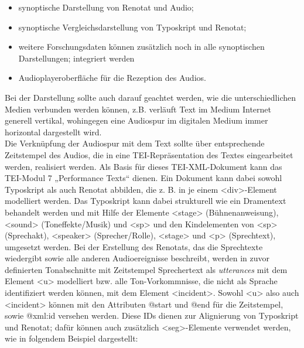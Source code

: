 \documentclass{article}
\begin{document}
        \begin{itemize}\item {synoptische Darstellung von Renotat und Audio;}\item {synoptische Vergleichsdarstellung von Typoskript und Renotat;}\item {weitere Forschungsdaten können zusätzlich noch in alle synoptischen
                     Darstellungen; integriert werden}\item {Audioplayeroberfläche für die Rezeption des Audios.}\end{itemize}Bei der Darstellung sollte auch darauf geachtet werden, wie die unterschiedlichen
                  Medien verbunden werden können, z.B. verläuft Text im Medium Internet generell
                  vertikal, wohingegen eine Audiospur im digitalen Medium immer horizontal
                  dargestellt wird. \\
            
        Die Verknüpfung der Audiospur mit dem Text sollte über entsprechende Zeitstempel
                  des Audios, die in eine TEI-Repräsentation des Textes eingearbeitet werden,
                  realisiert werden. Als Basis für dieses TEI-XML-Dokument kann das TEI-Modul 7
                  „Performance Texts“ dienen. Ein Dokument kann dabei sowohl Typoskript als auch
                  Renotat abbilden, die z. B. in je einem <div>-Element
                  modelliert werden. Das Typoskript kann dabei strukturell wie ein Dramentext
                  behandelt werden und mit Hilfe der Elemente <stage>
                  (Bühnenanweisung), <sound> (Toneffekte/Musik) und
                     <sp> und den Kindelementen von <sp>
                  (Sprechakt), <speaker> (Sprecher/Rolle),
                     <stage> und <p> (Sprechtext), umgesetzt
                  werden. Bei der Erstellung des Renotats, das die Sprechtexte wiedergibt sowie alle
                  anderen Audioereignisse beschreibt, werden in zuvor definierten Tonabschnitte mit
                  Zeitstempel Sprechertext als \emph{utterances} mit dem Element
                     <u> modelliert bzw. alle Ton-Vorkommnisse, die nicht als
                  Sprache identifiziert werden können, mit dem Element
                  <incident>. Sowohl <u> also auch
                     <incident> können mit den Attributen @start und @end für die Zeitstempel, sowie @xml:id versehen werden. Diese IDs dienen zur Alignierung von
                  Typoskript und Renotat; dafür können auch zusätzlich
                  <seg>-Elemente verwendet werden, wie in folgendem Beispiel
                  dargestellt:\\
            
\end{document}
